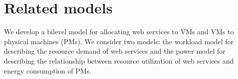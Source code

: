 





\section{Related models}
We develop a bilevel model for allocating web services to VMs and VMs to physical machines (PMs). We consider two models: the workload model for describing the resource demand of web services and the power model for describing the relationship between resource utilization of web services and energy consumption of PMs.


